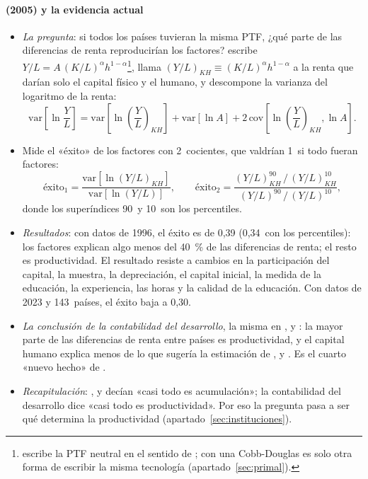 \documentclass[11pt]{article}
\begin{document}
\paragraph{ (2005) y la evidencia actual}

\begin{itemize}
\item \emph{La pregunta}: si todos los países tuvieran la misma PTF, ¿qué parte de las diferencias de renta reproducirían los factores? \textcite{Caselli2005Accounting} escribe $Y/L=A\,(K/L)^{\alpha}h^{1-\alpha}$\footnote{\textcite{Caselli2005Accounting} escribe la PTF neutral en el sentido de ; con una Cobb-Douglas es solo otra forma de escribir la misma tecnología (apartado~\ref{sec:primal}).}, llama $(Y/L)_{KH}\equiv(K/L)^{\alpha}h^{1-\alpha}$ a la renta que darían solo el capital físico y el humano, y descompone la varianza del logaritmo de la renta:
  \[
  \mathrm{var}\left[\ln\frac{Y}{L}\right]=\mathrm{var}\left[\ln\left(\frac{Y}{L}\right)_{KH}\right]+\mathrm{var}\left[\ln A\right]+2\,\mathrm{cov}\left[\ln\left(\frac{Y}{L}\right)_{KH},\ln A\right].
  \]
\item Mide el «éxito» de los factores con 2~cocientes, que valdrían 1~si todo fueran factores:
  \[
  \text{éxito}_1=\frac{\mathrm{var}\left[\ln(Y/L)_{KH}\right]}{\mathrm{var}\left[\ln(Y/L)\right]},\qquad \text{éxito}_2=\frac{(Y/L)_{KH}^{90}\,/\,(Y/L)_{KH}^{10}}{(Y/L)^{90}\,/\,(Y/L)^{10}},
  \]
  donde los superíndices 90~y 10~son los percentiles.
\item \emph{Resultados}: con datos de 1996, el éxito es de 0,39 (0,34~con los percentiles): los factores explican algo menos del 40~\% de las diferencias de renta; el resto es productividad. El resultado resiste a cambios en la participación del capital, la muestra, la depreciación, el capital inicial, la medida de la educación, la experiencia, las horas y la calidad de la educación\nocite{Caselli2005Accounting}. Con datos de 2023 y 143~países, el éxito baja a 0,30\nocite{GGDC2025PWT}.
\item \emph{La conclusión de la contabilidad del desarrollo}, la misma en \textcite{KlenowRodriguezClare1997Neoclassical}, \textcite{HallJones1999Why} y \textcite{Caselli2005Accounting}: la mayor parte de las diferencias de renta entre países es productividad, y el capital humano explica menos de lo que sugería la estimación de ,  y . Es el cuarto «nuevo hecho» de \textcite{JonesRomer2010}.
\item \emph{Recapitulación}: ,  y  decían «casi todo es acumulación»; la contabilidad del desarrollo dice «casi todo es productividad». Por eso la pregunta pasa a ser qué determina la productividad (apartado~\ref{sec:instituciones}).
\end{itemize}
\end{document}
